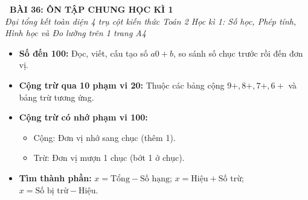 \documentclass[11pt,a4paper]{article}
\begin{document}
\begin{tcolorbox}[
  enhanced,
  colback=violet!8!white,
  colframe=violet!70!black,
  arc=3mm, boxrule=1.2pt,
  left=3mm, right=3mm, top=2mm, bottom=2mm,
  halign=center
]
  {\LARGE\bfseries\color{violet!90!black}\faBookmark\ BÀI 36: ÔN TẬP CHUNG HỌC KÌ 1}\\[1mm]
  {\itshape\footnotesize\color{black!75} Đại tổng kết toàn diện 4 trụ cột kiến thức Toán 2 Học kì 1: Số học, Phép tính, Hình học và Đo lường trên 1 trang A4}
\end{tcolorbox}

\vspace{-2mm}

\noindent
\begin{minipage}[t]{0.49\textwidth}\vspace{0pt}
\begin{tcolorbox}[
  enhanced,
  colback=violet!4!white,
  colframe=violet!75!black,
  arc=2mm, boxrule=0.8pt,
  left=2mm, right=2mm, top=1.8mm, bottom=1.8mm,
  title={\footnotesize\bfseries\color{white}\faKey\ 1. Trụ cột Số học \& Phép tính}
]
{\footnotesize
\begin{itemize}\setlength{\itemsep}{1pt}\setlength{\leftskip}{-2.5mm}
  \item \textbf{Số đến 100:} Đọc, viết, cấu tạo số $a0 + b$, so sánh số chục trước rồi đến đơn vị.
  \item \textbf{Cộng trừ qua 10 phạm vi 20:} Thuộc các bảng cộng $9+, 8+, 7+, 6+$ và bảng trừ tương ứng.
  \item \textbf{Cộng trừ có nhớ phạm vi 100:}
  \begin{itemize}\setlength{\itemsep}{0.5pt}\setlength{\leftskip}{-2.5mm}
    \item Cộng: Đơn vị nhớ sang chục (thêm 1).
    \item Trừ: Đơn vị mượn 1 chục (bớt 1 ở chục).
  \end{itemize}
  \item \textbf{Tìm thành phần:} $x = \text{Tổng} - \text{Số hạng}$; $x = \text{Hiệu} + \text{Số trừ}$; $x = \text{Số bị trừ} - \text{Hiệu}$.
\end{itemize}
}
\end{tcolorbox}
\end{minipage}
\hfill
\end{document}
